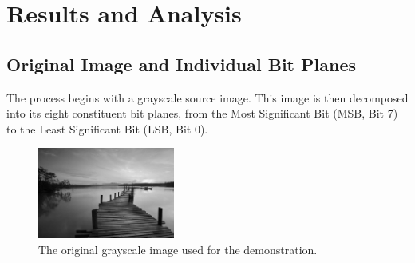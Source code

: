 \documentclass{article}
\begin{document}
\section{Results and Analysis}

\subsection{Original Image and Individual Bit Planes}
The process begins with a grayscale source image. This image is then decomposed into its eight constituent bit planes, from the Most Significant Bit (MSB, Bit 7) to the Least Significant Bit (LSB, Bit 0).

\begin{figure}[H]
    \centering
    \includegraphics[width=0.4\textwidth]{images/original_image.png}
    \caption{The original grayscale image used for the demonstration.}
    \label{fig:original}
\end{figure}
\end{document}
